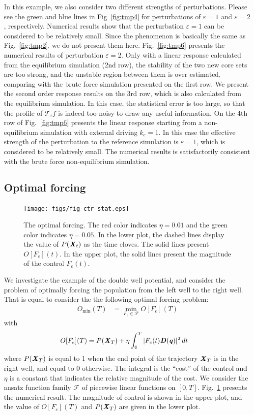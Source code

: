 \documentclass[aip,jcp,a4paper,reprint,onecolumn]{revtex4-1}
\newcommand{\vect}[1]{\textbf{\textit{#1}}}
\newcommand{\eps}{\varepsilon}
\newcommand{\mt}{\mathcal T}
\begin{document}
In this example, we also consider two different strengths of
perturbations. Please see the green and blue lines in Fig~\ref{fig:tmp4} for
perturbations of $\eps = 1$ and $\eps = 2$, respectively.
Numerical results show that the perturbation $\eps=1$ can be considered to be
relatively small. Since the phenomenon is basically the same as
Fig.~\ref{fig:tmp2}, we do not present them here.
Fig.~\ref{fig:tmp6} presents the numerical results of perturbation $\eps =
2$.  Only with a linear response calculated from the equilibrium
simulation (2nd row), the stability of the two new core sets are too
strong, and the unstable region between them is over estimated, comparing with
the brute force simulation presented on the first row.
We present the  second order response results on the 3rd row, which is
also calculated from the equilibrium simulation. In this case, the statistical
error is too large, so that
the profile of $\mt_\tau f$ is indeed too noisy to draw any useful information.
On the 4th row of Fig.~\ref{fig:tmp6} presents the linear response starting
from a non-equilibrium simulation with external driving $k_e = 1$.
In this case the effective strength of the perturbation to the reference
simulation is $\eps = 1$, which is considered to be relatively small.
The numerical results is satisfactorily consistent with the brute force
non-equilibrium simulation.


\subsection{Optimal forcing}
\begin{figure}
  \centering
  \texttt{[image: figs/fig-ctr-stat.eps]}
  \caption{The optimal forcing.
    The red color indicates $\eta = 0.01$ and the
    green color indicates $\eta = 0.05$.
    In the lower plot, the dashed lines display the
    value of $P(\vect X_t)$ as the time eloves.
    The solid lines present $O[F_e](t)$.  In the upper
    plot, the solid lines present the magnitude of the
    control $F_e(t)$.
  }\label{fig:tmp7}
\end{figure}

We investigate the example of the double well potential, and
consider the problem of optimally forcing the population from the
left well to the right well. That is equal to consider the 
the following optimal forcing problem:
\begin{align}
  O_{\min}(T)& = \min_{F_e\in\mathcal F} O[F_e](T) 
\end{align}
with
\begin{align}
  O[F_e](T) &= P(\vect X_T) + \eta \int_0^T\vert F_e(t)\vect D(\vect q)\vert^2\, dt
\end{align}
where $P(\vect X_T)$ is equal to 1 when the end point of the
trajectory $\vect X_T$ is in the right well, and equal to 0 otherwise.
The integral is the ``cost'' of the control and $\eta$ is a constant
that indicates the relative magnitude of the cost. We consider the
ansatz function family $\mathcal F$ of piecewise linear functions on
$[0, T]$. 
Fig.~\ref{fig:tmp7} presents the numerical result. The magnitude of control
is shown in the upper plot, and the value of $O[F_e](T)$ and $P(\vect X_T)$
are given in the lower plot. 
\end{document}
